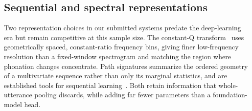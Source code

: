 \subsection{Sequential and spectral representations}

Two representation choices in our submitted systems predate the deep-learning
era but remain competitive at this sample size. The constant-Q
transform~\cite{brown1991cqt} uses geometrically spaced, constant-ratio
frequency bins, giving finer low-frequency resolution than a fixed-window
spectrogram and matching the region where phonation changes concentrate. Path
signatures summarize the ordered geometry of a multivariate sequence rather
than only its marginal statistics, and are established tools for sequential
learning~\cite{toth2020signatures}. Both retain information that
whole-utterance pooling discards, while adding far fewer parameters than a
foundation-model head.
